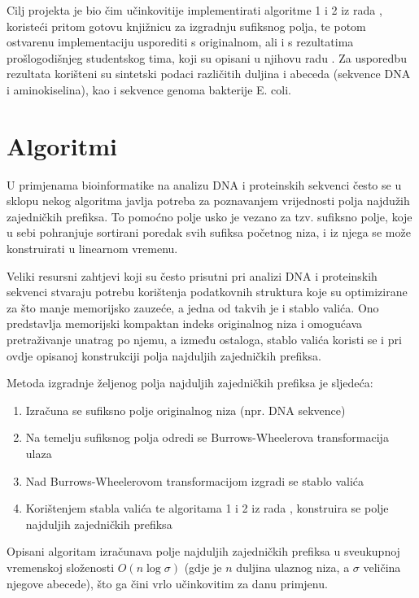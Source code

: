 \documentclass[a4paper,12pt]{article}
\begin{document}
Cilj projekta je bio čim učinkovitije implementirati algoritme 1 i 2 iz rada \cite{beller2013}, koristeći pritom gotovu knjižnicu za izgradnju sufiksnog polja, te potom ostvarenu implementaciju usporediti s originalnom, ali i s rezultatima prošlogodišnjeg studentskog tima, koji su opisani u njihovu radu \cite{studenti2017}. Za usporedbu rezultata korišteni su sintetski podaci različitih duljina i abeceda (sekvence DNA i aminokiselina), kao i sekvence genoma bakterije E. coli.

\newpage

\section{Algoritmi}
U primjenama bioinformatike na analizu DNA i proteinskih sekvenci često se u sklopu nekog algoritma javlja potreba za poznavanjem vrijednosti polja najdužih zajedničkih prefiksa. To pomoćno polje usko je vezano za tzv. sufiksno polje, koje u sebi pohranjuje sortirani poredak svih sufiksa početnog niza, i iz njega se može konstruirati u linearnom vremenu.

Veliki resursni zahtjevi koji su često prisutni pri analizi DNA i proteinskih sekvenci stvaraju potrebu korištenja podatkovnih struktura koje su optimizirane za što manje memorijsko zauzeće, a jedna od takvih je i stablo valića. Ono predstavlja memorijski kompaktan indeks originalnog niza i omogućava pretraživanje unatrag po njemu, a između ostaloga, stablo valića koristi se i pri ovdje opisanoj konstrukciji polja najduljih zajedničkih prefiksa.

Metoda izgradnje željenog polja najduljih zajedničkih prefiksa je sljedeća:
\begin{enumerate}
	\item Izračuna se sufiksno polje originalnog niza (npr. DNA sekvence)
	\item Na temelju sufiksnog polja odredi se Burrows-Wheelerova transformacija ulaza
	\item Nad Burrows-Wheelerovom transformacijom izgradi se stablo valića
	\item Korištenjem stabla valića te algoritama 1 i 2 iz rada \cite{beller2013}, konstruira se polje najduljih zajedničkih prefiksa
\end{enumerate}

Opisani algoritam izračunava polje najduljih zajedničkih prefiksa u  sveukupnoj vremenskoj složenosti $O(n\log\sigma)$ (gdje je $n$ duljina ulaznog niza, a $\sigma$ veličina njegove abecede), što ga čini vrlo učinkovitim za danu primjenu.
\end{document}
